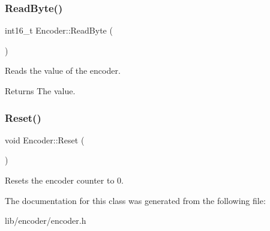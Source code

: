 \subsubsection{\texorpdfstring{Read\+Byte()}{ReadByte()}}
{\footnotesize\ttfamily int16\+\_\+t Encoder\+::\+Read\+Byte (\begin{DoxyParamCaption}{ }\end{DoxyParamCaption})}

Reads the value of the encoder. \begin{DoxyReturn}{Returns}
The value. 
\end{DoxyReturn}
\hypertarget{class_encoder_a4375bf4d88d56f5f5d09860f9062d691}{}\label{class_encoder_a4375bf4d88d56f5f5d09860f9062d691} 
\subsubsection{\texorpdfstring{Reset()}{Reset()}}
{\footnotesize\ttfamily void Encoder\+::\+Reset (\begin{DoxyParamCaption}{ }\end{DoxyParamCaption})}

Resets the encoder counter to 0. 

The documentation for this class was generated from the following file\+:\begin{DoxyCompactItemize}
\item 
lib/encoder/encoder.\+h\end{DoxyCompactItemize}
